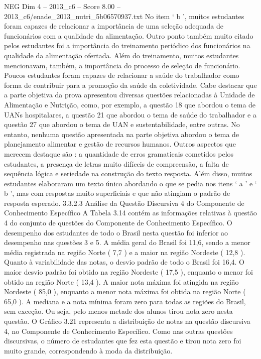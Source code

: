 \begin{textsample}{NEG Dim 4 – 2013\_c6 – Score 8.00 – 2013\_c6/enade\_2013\_nutri\_5b06570937.txt}
No item ‘ b ’, muitos estudantes foram capazes de relacionar a importância de uma seleção adequada de funcionários com a qualidade da alimentação.
Outro ponto também muito citado pelos estudantes foi a importância do treinamento periódico dos funcionários na qualidade da alimentação ofertada.
Além do treinamento, muitos estudantes mencionavam, também, a importância do processo de seleção de funcionário.
Poucos estudantes foram capazes de relacionar a saúde do trabalhador como forma de contribuir para a promoção da saúde da coletividade.
Cabe destacar que a parte objetiva da prova apresentou diversas questões relacionadas à Unidade de Alimentação e Nutrição, como, por exemplo, a questão 18 que abordou o tema de UANs hospitalares, a questão 21 que abordou o tema de saúde do trabalhador e a questão 27 que abordou o tema de UAN e sustentabilidade, entre outras.
No entanto, nenhuma questão apresentada na parte objetiva abordou o tema de planejamento alimentar e gestão de recursos humanos.
Outros aspectos que merecem destaque são : a quantidade de erros gramaticais cometidos pelos estudantes, a presença de letras muito difíceis de compreensão, a falta de sequência lógica e seriedade na construção do texto resposta.
Além disso, muitos estudantes elaboraram um texto único abordando o que se pedia nos itens ‘ a ’ e ‘ b ’, mas com respostas muito superficiais e que não atingiam o padrão de resposta esperado. 3.3.2.3 Análise da Questão Discursiva 4 do Componente de Conhecimento Específico A Tabela 3.14 contém as informações relativas à questão 4 do conjunto de questões do Componente de Conhecimento Específico.
O desempenho dos estudantes de todo o Brasil nesta questão foi inferior ao desempenho nas questões 3 e 5.
A média geral do Brasil foi 11,6, sendo a menor média registrada na região Norte ( 7,7 ) e a maior na região Nordeste ( 12,8 ).
Quanto à variabilidade das notas, o desvio padrão de todo o Brasil foi 16,4.
O maior desvio padrão foi obtido na região Nordeste ( 17,5 ), enquanto o menor foi obtido na região Norte ( 13,4 ).
A maior nota máxima foi atingida na região Nordeste ( 85,0 ), enquanto a menor nota máxima foi obtida na região Norte ( 65,0 ).
A mediana e a nota mínima foram zero para todas as regiões do Brasil, sem exceção.
Ou seja, pelo menos metade dos alunos tirou nota zero nesta questão.
O Gráfico 3.21 representa a distribuição de notas na questão discursiva 4, no Componente de Conhecimento Específico.
Como nas outras questões discursivas, o número de estudantes que fez esta questão e tirou nota zero foi muito grande, correspondendo à moda da distribuição.

\end{textsample}
